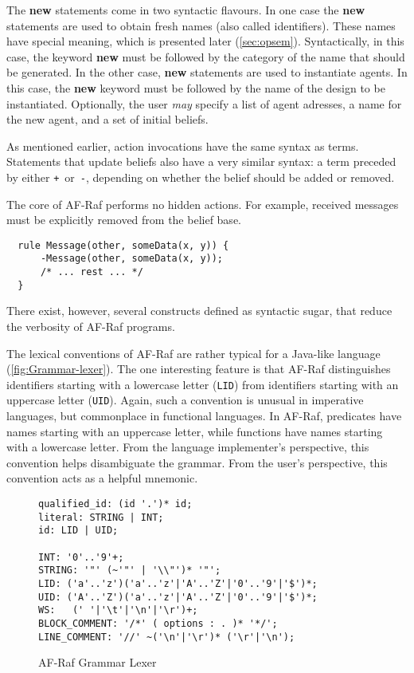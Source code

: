 \documentclass[a4paper,12pt,oneside,fleqn]{book} %
\begin{document}
The {\bf new} statements come in two syntactic flavours. In one case the
{\bf new} statements are used to obtain fresh names (also called
identifiers). These names have special meaning, which is presented later
(\autoref{sec:opsem}). Syntactically, in this case, the keyword {\bf new}
must be followed by the category of the name that should be generated. In
the other case, {\bf new} statements are used to instantiate agents. In
this case, the {\bf new} keyword must be followed by the name of the design
to be instantiated. Optionally, the user \emph{may} specify a list of agent
adresses, a name for the new agent, and a set of initial beliefs.

As mentioned earlier, action invocations have the same syntax as terms.
Statements that update beliefs also have a very similar syntax: a term
preceded by either \verb-+-~or~\verb+-+, depending on whether the belief
should be added or removed.

\begin{example}
The core of AF-Raf performs no hidden actions. For example, received
messages must be explicitly removed from the belief base.
\begin{verbatim}
  rule Message(other, someData(x, y)) {
      -Message(other, someData(x, y));
      /* ... rest ... */
  }
\end{verbatim}
There exist, however, several constructs defined as syntactic sugar, that
reduce the verbosity of AF-Raf programs.
\end{example}

The lexical conventions of AF-Raf are rather typical for a Java-like
language (\autoref{fig:Grammar-lexer}). The one interesting feature is that
AF-Raf distinguishes identifiers starting with a lowercase letter
(\verb+LID+) from identifiers starting with an uppercase letter
(\verb+UID+). Again, such a convention is unusual in imperative languages,
but commonplace in functional languages. In AF-Raf, predicates have names
starting with an uppercase letter, while functions have names starting with
a lowercase letter. From the language implementer's perspective, this
convention helps disambiguate the grammar. From the user's perspective,
this convention acts as a helpful mnemonic.

\begin{figure}\footnotesize %
\begin{verbatim}
qualified_id: (id '.')* id;
literal: STRING | INT;
id: LID | UID;

INT: '0'..'9'+;
STRING: '"' (~'"' | '\\"')* '"';
LID: ('a'..'z')('a'..'z'|'A'..'Z'|'0'..'9'|'$')*;
UID: ('A'..'Z')('a'..'z'|'A'..'Z'|'0'..'9'|'$')*;
WS:   (' '|'\t'|'\n'|'\r')+;
BLOCK_COMMENT: '/*' ( options : . )* '*/';
LINE_COMMENT: '//' ~('\n'|'\r')* ('\r'|'\n');
\end{verbatim}
\caption{AF-Raf Grammar Lexer}
\label{fig:Grammar-lexer}
\end{figure} %
\end{document}
